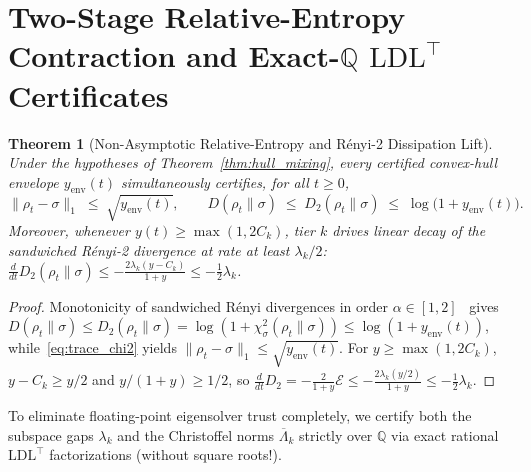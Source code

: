 \documentclass[11pt,a4paper]{article}
\newtheorem{theorem}{Theorem}[section]
\theoremstyle{definition}
\newcommand{\Q}{\mathbb{Q}}
\newcommand{\Edir}{\mathcal{E}}
\begin{document}
\section{Two-Stage Relative-Entropy Contraction and Exact-\texorpdfstring{$\Q$}{Q} \texorpdfstring{$\mathrm{LDL}^\top$}{LDLT} Certificates}
\label{sec:certificates}

\begin{theorem}[Non-Asymptotic Relative-Entropy and R\'enyi-2 Dissipation Lift]
\label{thm:entropy_lift}
Under the hypotheses of Theorem~\ref{thm:hull_mixing}, every certified convex-hull envelope $y_{\mathrm{env}}(t)$ simultaneously certifies, for all $t \ge 0$,
\begin{equation}
  \|\rho_t - \sigma\|_1 \;\le\; \sqrt{y_{\mathrm{env}}(t)}, \qquad
  D(\rho_t\|\sigma) \;\le\; D_2(\rho_t\|\sigma) \;\le\; \log\bigl(1 + y_{\mathrm{env}}(t)\bigr).
  \label{eq:entropy_lift}
\end{equation}
Moreover, whenever $y(t) \ge \max(1, 2 C_k)$, tier $k$ drives linear decay of the sandwiched R\'enyi-2 divergence at rate at least $\lambda_k / 2$: $\frac{d}{dt} D_2(\rho_t\|\sigma) \le -\frac{2\lambda_k(y - C_k)}{1 + y} \le -\frac{1}{2}\lambda_k$.
\end{theorem}

\begin{proof}
Monotonicity of sandwiched R\'enyi divergences in order $\alpha \in [1, 2]$~\cite{MullerLennert2013Sandwiched} gives $D(\rho_t\|\sigma) \le D_2(\rho_t\|\sigma) = \log(1 + \chi^2_\sigma(\rho_t\|\sigma)) \le \log(1 + y_{\mathrm{env}}(t))$, while~\eqref{eq:trace_chi2} yields $\|\rho_t - \sigma\|_1 \le \sqrt{y_{\mathrm{env}}(t)}$. For $y \ge \max(1, 2 C_k)$, $y - C_k \ge y/2$ and $y/(1 + y) \ge 1/2$, so $\frac{d}{dt}D_2 = -\frac{2}{1+y}\Edir \le -\frac{2\lambda_k(y/2)}{1+y} \le -\frac{1}{2}\lambda_k$.
\end{proof}

To eliminate floating-point eigensolver trust completely, we certify both the subspace gaps $\lambda_k$ and the Christoffel norms $\overline{\Lambda}_k$ strictly over $\Q$ via exact rational $\mathrm{LDL}^\top$ factorizations (without square roots!).
\end{document}
